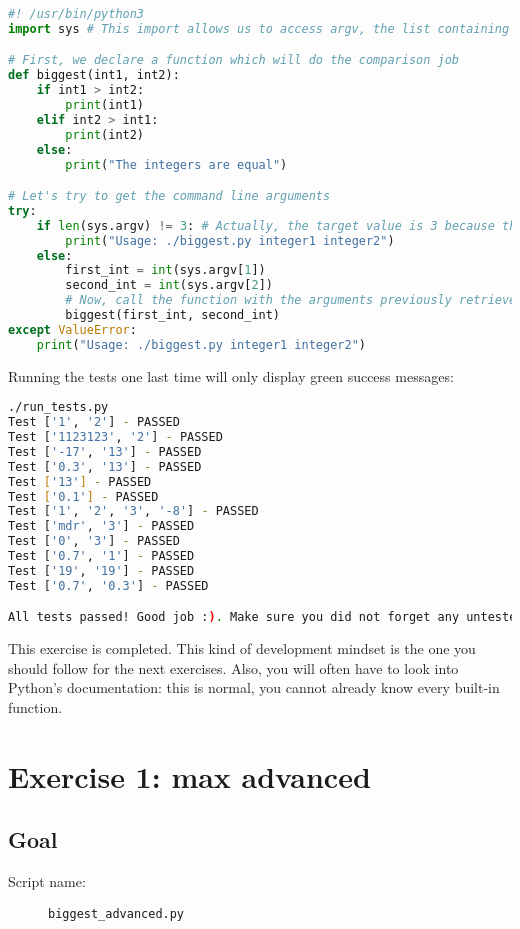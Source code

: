 \documentclass[12pt]{article}
\begin{document}
\begin{lstlisting}[style=codestyle,language=python,title=biggest.py]
#! /usr/bin/python3
import sys # This import allows us to access argv, the list containing the command line arguments

# First, we declare a function which will do the comparison job
def biggest(int1, int2):
    if int1 > int2:
        print(int1)
    elif int2 > int1:
        print(int2)
    else:
        print("The integers are equal")

# Let's try to get the command line arguments
try:
    if len(sys.argv) != 3: # Actually, the target value is 3 because the first element of argv is always the name of the script
        print("Usage: ./biggest.py integer1 integer2")
    else:
        first_int = int(sys.argv[1])
        second_int = int(sys.argv[2])
        # Now, call the function with the arguments previously retrieved
        biggest(first_int, second_int)
except ValueError:
    print("Usage: ./biggest.py integer1 integer2")
\end{lstlisting}

Running the tests one last time will only display green success messages:
\begin{lstlisting}[language=bash]
./run_tests.py 
Test ['1', '2'] - PASSED
Test ['1123123', '2'] - PASSED
Test ['-17', '13'] - PASSED
Test ['0.3', '13'] - PASSED
Test ['13'] - PASSED
Test ['0.1'] - PASSED
Test ['1', '2', '3', '-8'] - PASSED
Test ['mdr', '3'] - PASSED
Test ['0', '3'] - PASSED
Test ['0.7', '1'] - PASSED
Test ['19', '19'] - PASSED
Test ['0.7', '0.3'] - PASSED

All tests passed! Good job :). Make sure you did not forget any untested behavior
\end{lstlisting}

This exercise is completed. This kind of development mindset is the one you should follow for the next exercises. Also, you will often have to look into Python's documentation: this is normal, you cannot already know every built-in function.


\section{Exercise 1: max advanced}

\subsection{Goal}

\begin{description}
        \item[Script name:] \texttt{biggest\_advanced.py}
\end{description}
\end{document}
